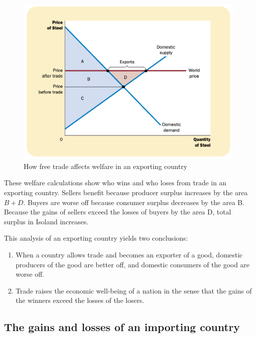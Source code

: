 \begin{figure}[!ht]
  \centering
  \includegraphics[width=\textwidth]{pics/how-free-trade-affects-walfare-in-an-exporting-country}
  \caption{How free trade affects welfare in an exporting country}
  \label{fig:how-free-trade-affects-walfare-in-an-exporting-country}
\end{figure}


These welfare calculations show who wins and who loses from trade in an exporting country. Sellers benefit because producer surplus increases by the area $B+D$. Buyers are worse off because consumer surplus decreases by the area B. Because the gains of sellers exceed the losses of buyers by the area D, total surplus in Isoland increases.



This analysis of an exporting country yields two conclusions:
\begin{enumerate}
\item When a country allows trade and becomes an exporter of a good, domestic producers of the good are better off, and domestic consumers of the good are worse off.
\item Trade raises the economic well-being of a nation in the sense that the gains of the winners exceed the losses of the losers.
\end{enumerate}



\subsection{The gains and losses of an importing country}

